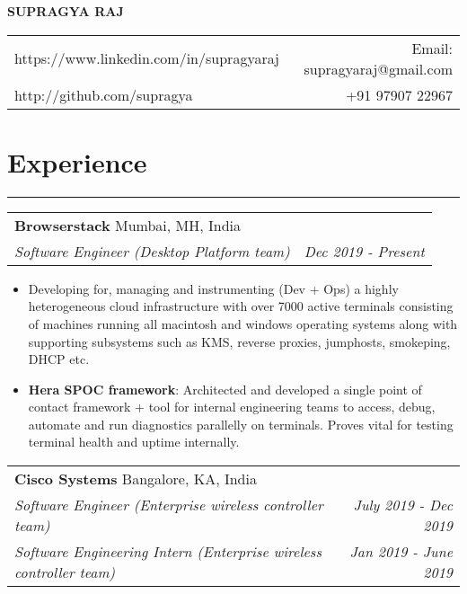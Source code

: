 \documentclass[a4paper,6pt]{article}
\begin{document}
\begin{center}
\Large \textbf{SUPRAGYA RAJ}


\end{center}
\begin{tabularx}{\textwidth}{X r}
	https://www.linkedin.com/in/supragyaraj & Email: supragyaraj@gmail.com \\
	http://github.com/supragya & +91 97907 22967 
\end{tabularx}


\section*{Experience}
\vspace{-8px}
\hrule


\vspace{4px}
\hspace{5px}
\begin{tabularx}{\textwidth}{X r}
	\large{\textbf{Browserstack }} \small Mumbai, MH, India& \\
	\textit{\small Software Engineer (Desktop Platform team)} & \textit{Dec 2019 - Present} \\
\end{tabularx}

\small
\begin{itemize}
	\itemsep0em
	\item Developing for, managing and instrumenting (Dev + Ops) a highly heterogeneous cloud infrastructure with over 7000 active terminals consisting of machines running all macintosh and windows operating systems along with supporting subsystems such as KMS, reverse proxies, jumphosts, smokeping, DHCP etc.
    \item \textcolor{mygray}{\textbf{Hera SPOC framework}}: Architected and developed a single point of contact framework + tool for internal engineering teams to access, debug, automate and run diagnostics parallelly on terminals. Proves vital for testing terminal health and uptime internally.
  \end{itemize}

\vspace{4px}
\hspace{5px}
\begin{tabularx}{\textwidth}{X r}
	\large{\textbf{Cisco Systems}} \small Bangalore, KA, India& \\
	\textit{\small Software Engineer (Enterprise wireless controller team)} & \textit{July 2019 - Dec 2019} \\
	\textit{\small Software Engineering Intern  (Enterprise wireless controller team)}& \textit{Jan 2019 - June 2019} \\
\end{tabularx}
\end{document}
